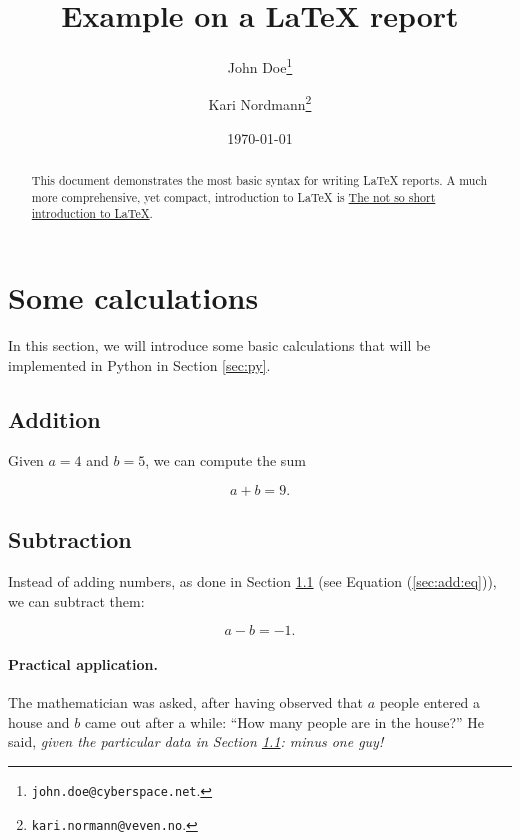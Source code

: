 \documentclass{article}
\begin{document}
\title{Example on a \LaTeX{} report}

\author{
John Doe\footnote{\texttt{john.doe@cyberspace.net}.}
\and
Kari Nordmann\footnote{\texttt{kari.normann@veven.no}.}
}

\date{\today}

\maketitle

\begin{abstract}
This document demonstrates the most basic syntax for writing \LaTeX{}
reports. A much more comprehensive, yet compact, introduction
to LaTeX{} is \href{http://tobi.oetiker.ch/lshort/lshort.pdf}{
The not so short introduction to LaTeX}.
\end{abstract}

\section{Some calculations}
\label{sec:calc}

In this section, we will introduce some basic calculations that
will be implemented in Python in Section \ref{sec:py}.

\subsection{Addition}
\label{sec:add}

Given $a=4$ and $b=5$, we can compute the sum

\begin{equation}
a + b = 9.
\label{sec:add:eq}
\end{equation}

\subsection{Subtraction}

Instead of adding numbers, as done in Section \ref{sec:add}
(see Equation (\ref{sec:add:eq})), we can subtract them:

\[ a - b = -1. \]

\paragraph{Practical application.}
The mathematician was asked, after having observed that $a$ people
entered a house and $b$ came out after a while: ``How many people are
in the house?'' He said, \emph{given the particular data in Section
\ref{sec:add}: minus one guy!}
\end{document}
